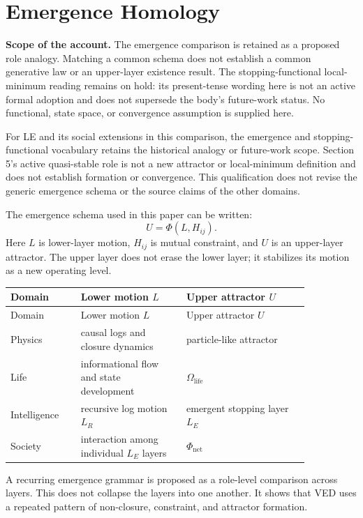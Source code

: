 \section{Emergence Homology}

\noindent\textbf{Scope of the account.} The emergence comparison is retained as a proposed role analogy. Matching a common schema does not establish a common generative law or an upper-layer existence result. The stopping-functional local-minimum reading remains on hold: its present-tense wording here is not an active formal adoption and does not supersede the body's future-work status. No functional, state space, or convergence assumption is supplied here.

For LE and its social extensions in this comparison, the emergence and stopping-functional vocabulary retains the historical analogy or future-work scope. Section 5's active quasi-stable role is not a new attractor or local-minimum definition and does not establish formation or convergence. This qualification does not revise the generic emergence schema or the source claims of the other domains.


The emergence schema used in this paper can be written:
\[
U=\Phi(L,H_{ij}).
\]
Here $L$ is lower-layer motion, $H_{ij}$ is mutual constraint, and $U$ is an upper-layer attractor. The upper layer does not erase the lower layer; it stabilizes its motion as a new operating level.

\begin{longtable}{@{}p{0.20\linewidth}p{0.30\linewidth}p{0.35\linewidth}@{}}
\toprule
Domain & Lower motion $L$ & Upper attractor $U$ \\
\midrule
\endfirsthead
\toprule
Domain & Lower motion $L$ & Upper attractor $U$ \\
\midrule
\endhead
Physics & causal logs and closure dynamics & particle-like attractor \\
Life & informational flow and state development & $\Omega_{\text{life}}$ \\
Intelligence & recursive log motion $L_R$ & emergent stopping layer $L_E$ \\
Society & interaction among individual $L_E$ layers & $\Phi_{\text{net}}$ \\
\bottomrule
\end{longtable}

A recurring emergence grammar is proposed as a role-level comparison across layers. This does not collapse the layers into one another. It shows that VED uses a repeated pattern of non-closure, constraint, and attractor formation.

\bigskip
